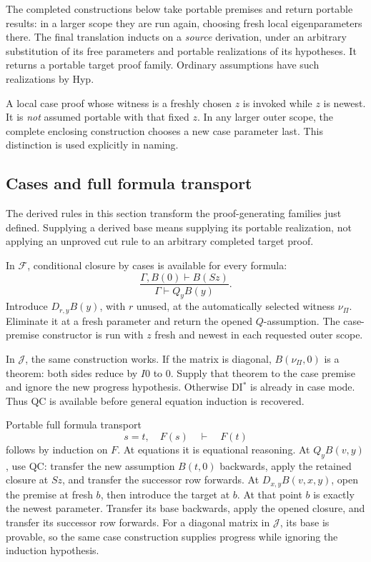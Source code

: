 \documentclass[11pt]{article}
\newcommand{\Fcal}{\mathcal F}
\newcommand{\Jcal}{\mathcal J}
\newcommand{\newest}{\nu_{\Pi}}
\begin{document}
The completed constructions below take portable premises and return
portable results: in a larger scope they are run again, choosing fresh
local eigenparameters there. The final translation inducts on a
\emph{source} derivation, under an arbitrary substitution of its free
parameters and portable realizations of its hypotheses. It returns a
portable target proof family. Ordinary assumptions have such realizations
by Hyp.

A local case proof whose witness is a freshly chosen \(z\) is invoked
while \(z\) is newest. It is \emph{not} assumed portable with that fixed
\(z\). In any larger outer scope, the complete enclosing construction chooses
a new case parameter last. This distinction is used explicitly in naming.

\subsection{Cases and full formula transport}

The derived rules in this section transform the proof-generating families
just defined. Supplying a derived base means supplying its portable realization,
not applying an unproved cut rule to an arbitrary completed target proof.

In \(\Fcal\), conditional closure by cases is available for every formula:
\[
 \frac{\Gamma,B(0)\vdash B(Sz)}
      {\Gamma\vdash Q_yB(y)}.
 \tag{QC}\label{eq:qc}
\]
Introduce \(D_{r,y}B(y)\), with \(r\) unused, at the automatically selected
witness \(\newest\). Eliminate it at a fresh parameter and return the opened
\(Q\)-assumption. The case-premise constructor is run with \(z\) fresh
and newest in each requested outer scope.

In \(\Jcal\), the same construction works. If the matrix is diagonal,
\(B(\newest,0)\) is a theorem: both sides reduce by \(I0\) to \(0\).
Supply that theorem to the case premise and ignore the new progress
hypothesis. Otherwise DI\(^*\) is already in case mode. Thus QC is
available before general equation induction is recovered.

Portable full formula transport
\[
 s=t,\quad F(s)\quad\vdash\quad F(t)
 \tag{L}\label{eq:leibniz}
\]
follows by induction on \(F\). At equations it is equational reasoning.
At \(Q_yB(v,y)\), use QC: transfer the new assumption \(B(t,0)\) backwards,
apply the retained closure at \(Sz\), and transfer the successor row forwards.
At \(D_{x,y}B(v,x,y)\), open the premise at fresh \(b\), then introduce the
target at \(b\). At that point \(b\) is exactly the newest parameter.
Transfer its base backwards, apply the opened closure, and transfer its
successor row forwards. For a diagonal matrix in \(\Jcal\), its base is
provable, so the same case construction supplies progress while ignoring
the induction hypothesis.
\end{document}
